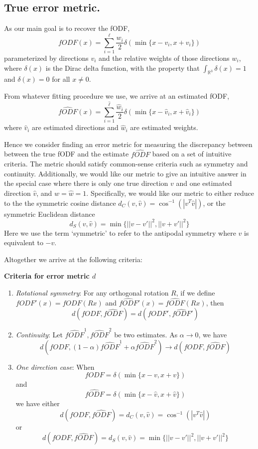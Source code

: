 \documentclass[11pt]{article}
\begin{document}
\subsection{True error metric.}

As our main goal is to recover the fODF,
\[
fODF(x) = \sum_{i=1}^\ell \frac{w_i}{2}\delta(\min\{x-v_i,x+v_i\})
\]
parameterized by directions $v_i$ and the relative
weights of those directions $w_i$,
where $\delta(x)$ is the Dirac delta function, with the property that
$\int_{\mathbb{R}^3} \delta(x) = 1$ and $\delta(x) = 0$ for all $x \neq
0$.

From whatever fitting procedure we use, we arrive at an estimated
fODF,
\[
\hat{fODF}(x) = \sum_{i=1}^{\hat{\ell}} \frac{\hat{w}_i}{2}\delta(\min\{x-\hat{v}_i,x+\hat{v}_i\})
\]
where $\hat{v}_i$ are estimated directions and $\hat{w}_i$ are
estimated weights.

Hence we consider finding an error metric for measuring the
discrepancy between between 
the true fODF and the estimate $\hat{fODF}$
based on a set of intuitive criteria.
The metric should satisfy common-sense criteria such as
symmetry and continuity.
Additionally, we would like our metric to give an intuitive answer in
the special case where there is only one true direction $v$ and one
estimated direction $\hat{v}$, and $w=\hat{w}=1$.
Specifically, we would like our metric to either reduce to the
the symmetric cosine distance $d_C(v,\hat{v})=\cos^{-1}(|v^T
\hat{v}|)$,
or the symmetric Euclidean distance
\[
d_S(v,\hat{v}) = \min \{||v-v'||^2, ||v+v'||^2\}
\]
Here we use the term `symmetric' to refer to the antipodal symmetry
where $v$ is equivalent to $-v$.

Altogether we arrive at the following criteria:

\noindent \textbf{Criteria for error metric $d$}
\begin{enumerate}
\item \emph{Rotational symmetry}:
For any orthogonal rotation $R$, if we define $fODF'(x)=fODF(Rx)$ and
$\hat{fODF}'(x) = \hat{fODF}(Rx)$, then
\[
d(fODF, \hat{fODF}) = d(fODF',\hat{fODF}')
\]
\item \emph{Continuity}:
Let $\hat{fODF}^1,\hat{fODF}^2$ be two estimates.
As $\alpha \to 0$, we have
\[
d(fODF,(1-\alpha)\hat{fODF}^1+\alpha\hat{fODF}^2) \to d(fODF,\hat{fODF})
\]
\item \emph{One direction case}:
When 
\[
fODF = \delta(\min\{x-v,x+v\})
\]
and
\[
\hat{fODF} = \delta(\min\{x-\hat{v},x+\hat{v}\})
\]
we have either
\[
d(fODF,\hat{fODF}) = d_C(v,\hat{v})=\cos^{-1}(|v^T \hat{v}|)
\]
or
\[
d(fODF,\hat{fODF}) =d_S(v,\hat{v}) = \min \{||v-v'||^2, ||v+v'||^2\}
\]
\end{enumerate}
\end{document}
